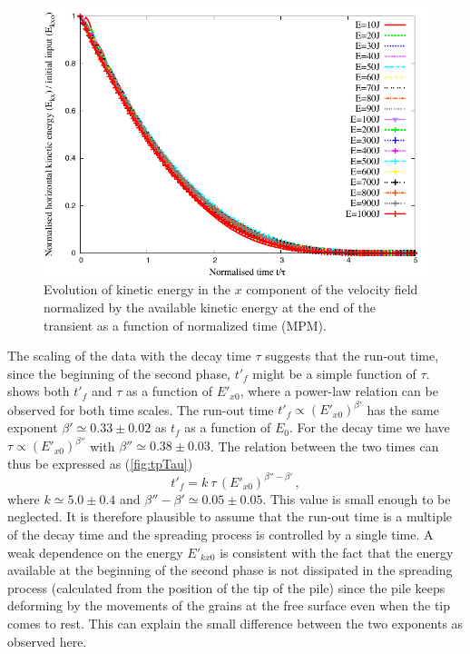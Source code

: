 \begin{figure}[tbhp]
\centering
\includegraphics[width=\textwidth]{EkxKoTTau_Slope}
\caption[Evolution of the normalised horizontal kinetic energy as function of 
the normalised time since the transient phase.]{Evolution of kinetic energy in 
the $x$ component of 
the velocity field  normalized by the available kinetic energy at the end of 
the transient as a function of normalized time (MPM).}
\label{fig:ExEx0_vs_ttau}
\end{figure}


The scaling of the data with the decay time $\tau$ suggests that the 
run-out time, since the beginning of the second phase, $t'_f$ might be a simple 
function of $\tau$.~ shows both $t'_f$ and $\tau$ as 
a function of $E'_{x0}$, where a power-law relation can be observed for both 
time scales. The run-out time $t'_f \propto (E'_{x0})^{\beta'}$ has the 
same exponent $\beta' \simeq 0.33 \pm 0.02$ as $t_f$ as a function of $E_0$. 
For the decay time we have $\tau \propto (E'_{x0})^{\beta''}$ with $\beta'' 
\simeq 0.38 \pm 0.03$. The relation between the two times can thus be expressed 
as (\cref{fig:tpTau})
\begin{equation}
t'_f = k  \ \tau \, (E'_{x0})^{\beta'' - \beta'} \,,
\label{eqn:t'f}
\end{equation}
where $k \simeq 5.0 \pm 0.4$ and $\beta'' - \beta' \simeq 0.05 \pm 0.05$. This 
value is small enough to be neglected. It is therefore plausible to assume that 
the run-out time is a multiple of the decay time and the spreading process is 
controlled by a single time. A weak dependence on the energy $E'_{kx0}$ is 
consistent with the fact that the energy available at the beginning of the 
second phase is not dissipated in the spreading process (calculated from the 
position of the tip of the pile) since the pile keeps deforming by the 
movements of the grains at the free surface even when the tip comes to rest. 
This can explain the small difference between the two exponents as observed 
here.


